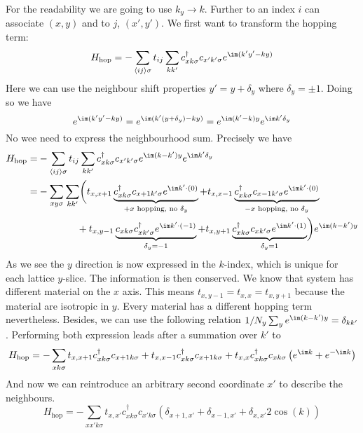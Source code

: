 \documentclass[../main.tex]{subfile}
\begin{document}
For the readability we are going to use $k_y \rightarrow k$.
Further to an index $i$  can associate $(x,y)$ and to $j$, $(x',y')$.
We first want to transform the hopping term:
\begin{equation*}
    H_{\text{hop}} = -\sum_{\langle ij\rangle \sigma} t_{ij} \sum_{kk'} c^{\dagger}_{x k\sigma} c_{x' k'\sigma} e^{\im (k' y' - k y)}
\end{equation*}
Here we can use the neighbour shift properties $y' = y + \delta_y$ where $\delta_y = \pm 1$. Doing so we have 
\[
    e^{\im (k' y' - k y)} = e^{\im (k' (y+\delta_y) -  k y)} = e^{\im (k' -  k)y}e^{\im k'\delta_y}
\]
No wee need to express the neighbourhood sum. Precisely we have
\begin{align*}
        H_{\text{hop}} =& -\sum_{\langle ij\rangle \sigma} t_{ij} \sum_{kk'} c^{\dagger}_{x k\sigma} c_{x' k'\sigma}  e^{\im (k -  k')y}e^{\im k'\delta_y}\\
                        =& -\sum_{xy \sigma} \sum_{kk'}  \biggl( t_{x,x+1} \underbrace{c_{x k\sigma}^{\dagger} c_{x+1 k'\sigma}e^{\im k'\cdot (0)}}_{\text{$+x$ hopping, no $\delta_y$}} +  t_{x,x-1} \underbrace{c_{x k\sigma}^{\dagger} c_{x-1 k'\sigma} e^{\im k'\cdot (0)}}_{\text{$-x$ hopping, no $\delta_y$}}\\
                        & ~~~~~~~~~~~~+t_{x,y-1} \underbrace{c_{x k\sigma} c_{x k'\sigma}^{\dagger} e^{\im k'\cdot (-1)}}_{\delta_y = -1} + t_{x,y+1} \underbrace{c_{x k\sigma}^{\dagger} c_{x k'\sigma}e^{\im k'\cdot (1)}}_{\delta_y = 1}\biggr)e^{\im (k -  k')y}
\end{align*}
As we see the $y$ direction is now expressed in the $k$-index, which is unique for each lattice $y$-slice. The information is then conserved. 
We know that system has different material on the $x$ axis. This means $t_{x,y-1} = t_{x,x} = t_{x,y+1}$ because the material are isotropic in $y$. Every material has a 
different hopping term nevertheless. Besides, we can use the following relation $1/N_y \sum_{y} e^{\im (k -  k')y} = \delta_{kk'}$. Performing both expression leads after a summation over $k'$ to
\begin{equation*}
    H_{\text{hop}} = -\sum_{x k \sigma} t_{x,x+1} c_{x k\sigma}^{\dagger} c_{x+1 k\sigma} + t_{x,x-1} c_{x k\sigma}^{\dagger} c_{x+1 k\sigma} +  t_{x,x} c_{x k\sigma}^{\dagger} c_{xk\sigma}\left(e^{\im k} + e^{-\im k}\right)
\end{equation*}
And now we can reintroduce an arbitrary second coordinate $x'$ to describe the neighbours.
\begin{equation}
    H_{\text{hop}} = -\sum_{xx' k \sigma} t_{x,x'} c_{x k\sigma}^{\dagger} c_{x' k\sigma} \left(\delta_{x+1,x'} + \delta_{x-1,x'} + \delta_{x,x'} 2 \cos(k)\right)
\end{equation}
\end{document}
